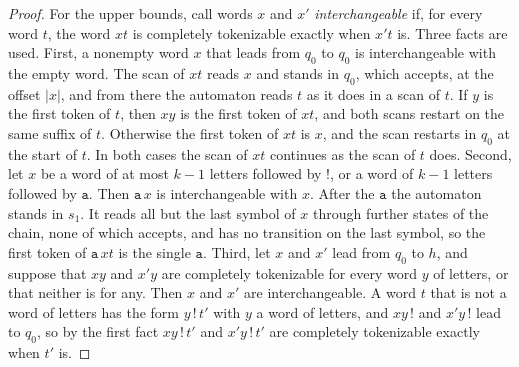 \documentclass[11pt,a4paper]{article}
\theoremstyle{definition}
\theoremstyle{plain}
\newcommand{\code}[1]{\texttt{#1}}
\begin{document}
\begin{proof}
For the upper bounds, call words $x$ and $x'$ \emph{interchangeable} if, for every word $t$, the word $xt$ is completely
tokenizable exactly when $x't$ is. Three facts are used. First, a nonempty word $x$ that leads from $q_0$ to $q_0$ is
interchangeable with the empty word. The scan of $xt$ reads $x$ and stands in $q_0$, which accepts, at the offset $|x|$,
and from there the automaton reads $t$ as it does in a scan of $t$. If $y$ is the first token of $t$, then $xy$ is the
first token of $xt$, and both scans restart on the same suffix of $t$. Otherwise the first token of $xt$ is $x$, and the
scan restarts in $q_0$ at the start of $t$. In both cases the scan of $xt$ continues as the scan of $t$ does. Second,
let $x$ be a word of at most $k - 1$ letters followed by $\code{!}$, or a word of $k - 1$ letters followed by
$\code{a}$. Then $\code{a}\,x$ is interchangeable with $x$. After the $\code{a}$ the automaton stands in $s_1$. It reads
all but the last symbol of $x$ through further states of the chain, none of which accepts, and has no transition on the
last symbol, so the first token of $\code{a}\,xt$ is the single $\code{a}$. Third, let $x$ and $x'$ lead from $q_0$ to
$h$, and suppose that $xy$ and $x'y$ are completely tokenizable for every word $y$ of letters, or that neither is for
any. Then $x$ and $x'$ are interchangeable. A word $t$ that is not a word of letters has the form $y\,\code{!}\,t'$ with
$y$ a word of letters, and $xy\,\code{!}$ and $x'y\,\code{!}$ lead to $q_0$, so by the first fact $xy\,\code{!}\,t'$ and
$x'y\,\code{!}\,t'$ are completely tokenizable exactly when $t'$ is.


\end{proof}
\end{document}
